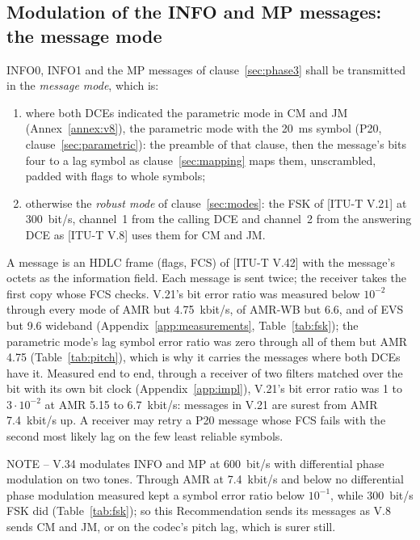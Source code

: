 \documentclass[a4paper,11pt]{article}
\newcounter{annex}
\newcommand{\itunote}[1]{\par{\small NOTE -- #1}\par}
\newcommand{\rec}[1]{[ITU-T #1]}
\newcommand{\kbs}{kbit/s}
\begin{document}
\subsection{Modulation of the INFO and MP messages: the message mode}\label{sec:infomod}
INFO0, INFO1 and the MP messages of clause~\ref{sec:phase3} shall be
transmitted in the \emph{message mode}, which is:
\begin{enumerate}[label=\alph*)]
\item where both DCEs indicated the parametric mode in CM and JM
  (Annex~\ref{annex:v8}), the parametric mode with the 20~ms symbol
  (P20, clause~\ref{sec:parametric}): the preamble of that clause, then
  the message's bits four to a lag symbol as clause~\ref{sec:mapping}
  maps them, unscrambled, padded with flags to whole symbols;
\item otherwise the \emph{robust mode} of clause~\ref{sec:modes}: the FSK
  of \rec{V.21} at 300~bit/s, channel~1 from the calling DCE and
  channel~2 from the answering DCE as \rec{V.8} uses them for CM and JM.
\end{enumerate}
A message is an HDLC frame (flags, FCS) of \rec{V.42} with the message's
octets as the information field.  Each message is sent twice; the
receiver takes the first copy whose FCS checks.  V.21's bit error ratio
was measured below $10^{-2}$ through every mode of AMR but 4.75~\kbs{},
of AMR-WB but 6.6, and of EVS but 9.6 wideband
(Appendix~\ref{app:measurements}, Table~\ref{tab:fsk}); the parametric
mode's lag symbol error ratio was zero through all of them but AMR 4.75
(Table~\ref{tab:pitch}), which is why it carries the messages where both
DCEs have it.  Measured end to end, through a receiver of two filters matched
over the bit with its own bit clock (Appendix~\ref{app:impl}), V.21's bit
error ratio was 1 to $3 \cdot 10^{-2}$ at AMR 5.15 to
6.7~\kbs{}: messages in V.21 are surest from AMR 7.4~\kbs{} up.  A
receiver may retry a P20 message whose FCS fails with the second most
likely lag on the few least reliable symbols.

\itunote{V.34 modulates INFO and MP at 600~bit/s with differential phase
modulation on two tones.  Through AMR at 7.4~\kbs{} and below no
differential phase modulation measured kept a symbol error ratio below
$10^{-1}$, while 300~bit/s FSK did (Table~\ref{tab:fsk}); so this
Recommendation sends its messages as V.8 sends CM and JM, or on the
codec's pitch lag, which is surer still.}
\end{document}

